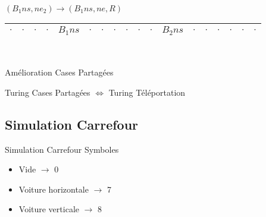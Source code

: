 \documentclass[12pt]{beamer}
\begin{document}
\begin{frame}{}
\begin{center}
\begin{tabular}{|c|c|c|c|c|c|c|c|c|c|c|c|c|c|c|c|c|c|}
\end{tabular}\\

        \pause

\vspace{0.5cm}

    $(B_1ns,ne_2) \longrightarrow (B_1ns, ne, R)$\\
    

\begin{tabular}{|c|c|c|c|c|c|c|c|c|c|c|c|c|c|c|c|c|c|}\hline
     $\cdot$ & $\cdot$ & $\cdot$ & $\cdot$ & $B_1ns$ & $\cdot$ & $\cdot$ & $\cdot$ & $\cdot$ & $\cdot$ & $\cdot$ & $B_2ns$ & $\cdot$ & $\cdot$ & $\cdot$ & $\cdot$ & $\cdot$ & $\cdot$ \\\hline    
     
\end{tabular}\\

    \end{center}
\end{frame}

\begin{frame}{Amélioration Cases Partagées}
\begin{center}
    \begin{tcolorbox}[colframe=red, hbox]
    \large Turing Cases Partagées $\Longleftrightarrow$ Turing Téléportation
\end{tcolorbox}
\end{center}

\end{frame}

\subsection{Simulation Carrefour}
\begin{frame}{Simulation Carrefour}
    Symboles
    \begin{itemize}
    \vspace{1cm}
        \item Vide $\longrightarrow$ 0 \\
        \vspace{1cm}
        \item Voiture horizontale $\longrightarrow$ 7 \\
        \vspace{1cm}
        \item Voiture verticale $\longrightarrow$ 8 \\
    \end{itemize}
\end{frame}
\end{document}
